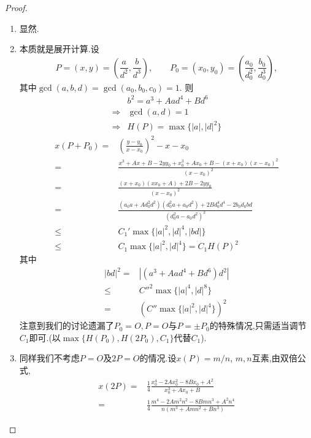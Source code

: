 \documentclass[12pt,A4paper,oneside,reqno]{amsart}
\numberwithin{equation}{section}
\theoremstyle{definition}
\theoremstyle{plain}
\theoremstyle{plain}
\numberwithin{equation}{section}
\theoremstyle{remark}
\begin{document}
\begin{proof}\
	\begin{enumerate}[1.]
		\item 显然.
		\item 本质就是展开计算.设$$ P=(x,y)=\left(\frac{a}{d^2},\frac{b}{d^3}\right),\qquad P_0=(x_0,y_0)=\left(\frac{a_0}{d_0^2},\frac{b_0}{d_0^3}\right), $$其中$\gcd (a,b,d)=\gcd(a_0,b_0,c_0)=1$.
		则\begin{equation*}
		\begin{aligned}
		&b^2=a^3+Aad^4+Bd^6\\
		\Longrightarrow& \gcd(a,d)=1\\
		\Longrightarrow&H(P)=\max\{|a|,|d|^2\}
		\end{aligned}
		\end{equation*}
		\begin{equation*}
		\begin{aligned}
		x(P+P_0)=&\left(\frac{y-y_0}{x-x_0}\right)^2-x-x_0\\
		=& \frac{x^3+Ax+B-2yy_0+x_0^3+Ax_0+B-(x+x_0)(x-x_0)^2}{(x-x_0)^2}\\
		=&\frac{(x+x_0)(xx_0+A)+2B-2yy_0}{(x-x_0)^2}\\
		=&\frac{(a_0a+Ad_0^2d^2)(d_0^2a+a_0d^2)+2Bd_0^4d^4-2b_0d_0bd}{(d_0^2a-a_0d^2)^2}\\
		\leqslant&C_1' \max \{|a|^2,|d|^4,|bd|\}\\
		\leqslant& C_1 \max \{|a|^2,|d|^4\}=C_1H(P)^2
		\end{aligned}
		\end{equation*}
		其中
		\begin{equation*}
		\begin{aligned}
		|bd|^2=&|(a^3+Aad^4+Bd^6)d^2|\\
		\leqslant& C''^2 \max \{|a|^4,|d|^8\}\\
		=&(C'' \max \{|a|^2,|d|^4\})^2
		\end{aligned}
		\end{equation*}
		注意到我们的讨论遗漏了$P_0=O,P=O$与$P= \pm P_0$的特殊情况,只需适当调节$C_1$即可.(以$\max\{H(P_0),H(2P_0),C_1\}$代替$C_1$).
		\item 同样我们不考虑$P=O$及$2P=O$的情况.设$x(P)=m/n$, $m,n$互素,由双倍公式,
		\begin{equation*}
		\begin{aligned}
		x(2P)=&\frac{1}{4}\frac{x_0^4-2Ax_0^2-8Bx_0+A^2}{x_0^3+Ax_0+B}\\
		=&\frac{1}{4}\frac{m^4-2Am^2n^2-8Bmn^3+A^2n^4}{n(m^3+Amn^2+Bn^3)}
		\end{aligned}

\end{equation*}
\end{enumerate}
\end{proof}
\end{document}

